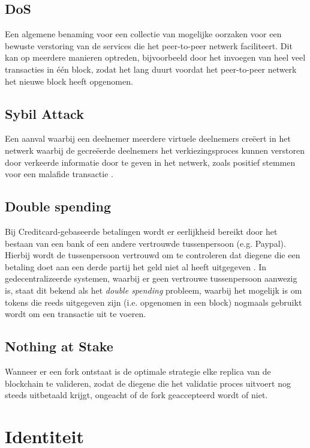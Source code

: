 \subsection{\acrfull{DoS}}
Een algemene benaming voor een collectie van mogelijke oorzaken voor een bewuste verstoring van de services die het peer-to-peer netwerk faciliteert. Dit kan op meerdere manieren optreden, bijvoorbeeld door het invoegen van heel veel transacties in één block, zodat het lang duurt voordat het peer-to-peer netwerk het nieuwe block heeft opgenomen.

\subsection{Sybil Attack}
Een aanval waarbij een deelnemer meerdere virtuele deelnemers creëert in het netwerk waarbij de gecreëerde deelnemers het verkiezingsproces kunnen verstoren door verkeerde informatie door te geven in het netwerk, zoals positief stemmen voor een malafide transactie \citep{conti2017survey}.

\clearpage

\subsection{Double spending}
Bij Creditcard-gebaseerde betalingen wordt er eerlijkheid bereikt door het bestaan van een bank of een andere vertrouwde tussenpersoon (e.g. Paypal). Hierbij wordt de tussenpersoon vertrouwd om te controleren dat diegene die een betaling doet aan een derde partij het geld niet al heeft uitgegeven \citep{karame2012two}. In gedecentralizeerde systemen, waarbij er geen vertrouwe tussenpersoon aanwezig is, staat dit bekend als het \textit{double spending} probleem, waarbij het mogelijk is om \glspl{token} die reeds uitgegeven zijn (i.e. opgenomen in een block) nogmaals gebruikt wordt om een transactie uit te voeren. 

\subsection{Nothing at Stake}
Wanneer er een \gls{fork} ontstaat is de optimale strategie elke replica van de blockchain te valideren, zodat de diegene die het validatie proces uitvoert nog steeds uitbetaald krijgt, ongeacht of de \gls{fork} geaccepteerd wordt of niet.

\newpage

\section{Identiteit}


